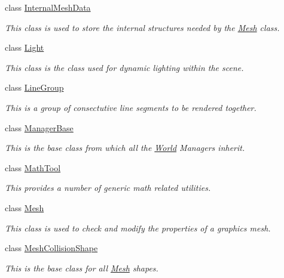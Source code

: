 \begin{DoxyCompactItemize}
class \hyperlink{classMezzanine_1_1InternalMeshData}{InternalMeshData}
\begin{DoxyCompactList}\small\item\em This class is used to store the internal structures needed by the \hyperlink{classMezzanine_1_1Mesh}{Mesh} class. \item\end{DoxyCompactList}\item 
class \hyperlink{classMezzanine_1_1Light}{Light}
\begin{DoxyCompactList}\small\item\em This class is the class used for dynamic lighting within the scene. \item\end{DoxyCompactList}\item 
class \hyperlink{classMezzanine_1_1LineGroup}{LineGroup}
\begin{DoxyCompactList}\small\item\em This is a group of consectutive line segments to be rendered together. \item\end{DoxyCompactList}\item 
class \hyperlink{classMezzanine_1_1ManagerBase}{ManagerBase}
\begin{DoxyCompactList}\small\item\em This is the base class from which all the \hyperlink{classMezzanine_1_1World}{World} Managers inherit. \item\end{DoxyCompactList}\item 
class \hyperlink{classMezzanine_1_1MathTool}{MathTool}
\begin{DoxyCompactList}\small\item\em This provides a number of generic math related utilities. \item\end{DoxyCompactList}\item 
class \hyperlink{classMezzanine_1_1Mesh}{Mesh}
\begin{DoxyCompactList}\small\item\em This class is used to check and modify the properties of a graphics mesh. \item\end{DoxyCompactList}\item 
class \hyperlink{classMezzanine_1_1MeshCollisionShape}{MeshCollisionShape}
\begin{DoxyCompactList}\small\item\em This is the base class for all \hyperlink{classMezzanine_1_1Mesh}{Mesh} shapes. \item\end{DoxyCompactList}\item 

\end{DoxyCompactItemize}

